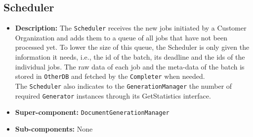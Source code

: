 \documentclass[a4paper,10pt]{article}
\begin{document}
\subsection{Scheduler}
\begin{itemize}
    \item \textbf{Description:} The \texttt{Scheduler} receives the new jobs initiated by a Customer Organization and adds them to a queue of all jobs that have not been processed yet. To lower the size of this queue, the Scheduler is only given the information it needs, i.e., the id of the batch, its deadline and the ids of the individual jobs. The raw data of each job and the meta-data of the batch is stored in \texttt{OtherDB} and fetched by the \texttt{Completer} when needed.\\
    The \texttt{Scheduler} also indicates to the \texttt{GenerationManager} the number of required \texttt{Generator} instances through its GetStatistics interface.
    \item \textbf{Super-component:} \texttt{DocumentGenerationManager}
    \item \textbf{Sub-components:} None
\end{itemize}
\end{document}
